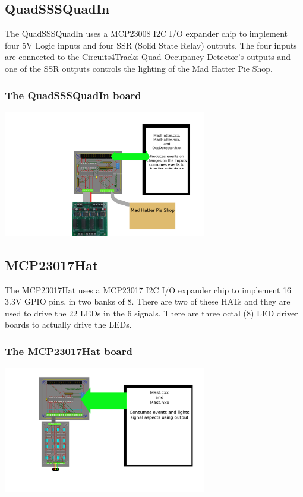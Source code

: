 \subsection{QuadSSSQuadIn}

The QuadSSSQuadIn uses a MCP23008 I2C I/O expander chip to implement four 5V 
Logic inputs and four SSR (Solid State Relay) outputs.  The four inputs are 
connected to the Circuits4Tracks Quad Occupancy Detector's outputs and one of 
the SSR outputs controls the lighting of the Mad Hatter Pie Shop.

\begin{frame}
    \frametitle{The QuadSSSQuadIn board}
    \includegraphics[width=3.5in]{QuadSSSQuadIn-frame.png}
\end{frame}


\subsection{MCP23017Hat}

The MCP23017Hat uses a MCP23017 I2C I/O expander chip to implement 16 3.3V 
GPIO pins, in two banks of 8.  There are two of these HATs and they are used 
to drive the 22 LEDs in the 6 signals.  There are three octal (8) LED driver 
boards to actually drive the LEDs.  

\begin{frame}
   \frametitle{The MCP23017Hat board}
   \includegraphics[width=3.5in]{MCP23017Hat-frame.png}
\end{frame}

